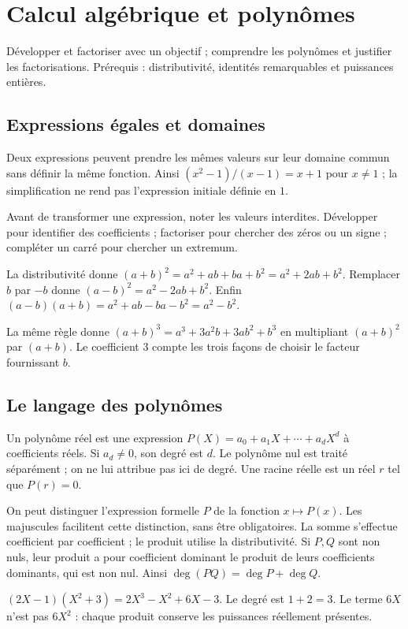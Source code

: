 \documentclass[../cours_1re.tex]{subfiles}
\begin{document}
\setcounter{chapter}{1}
\chapter{Calcul algébrique et polynômes}
\label{ch:02}
\begin{objectif}
Développer et factoriser avec un objectif ; comprendre les polynômes et justifier les factorisations. Prérequis : distributivité, identités remarquables et puissances entières.
\end{objectif}
\section{Expressions égales et domaines}
Deux expressions peuvent prendre les mêmes valeurs sur leur domaine commun sans définir la même fonction.
Ainsi $(x^2-1)/(x-1)=x+1$ pour $x\ne1$ ; la simplification ne rend pas l'expression initiale définie en $1$.
\begin{methode}
Avant de transformer une expression, noter les valeurs interdites. Développer pour identifier des coefficients ; factoriser pour chercher des zéros ou un signe ; compléter un carré pour chercher un extremum.
\end{methode}
\begin{demonstration}
La distributivité donne
$(a+b)^2=a^2+ab+ba+b^2=a^2+2ab+b^2$.
Remplacer $b$ par $-b$ donne $(a-b)^2=a^2-2ab+b^2$.
Enfin $(a-b)(a+b)=a^2+ab-ba-b^2=a^2-b^2$.
\end{demonstration}
La même règle donne $(a+b)^3=a^3+3a^2b+3ab^2+b^3$ en multipliant $(a+b)^2$ par $(a+b)$. Le coefficient $3$ compte les trois façons de choisir le facteur fournissant $b$.
\section{Le langage des polynômes}
\begin{definition}
Un polynôme réel est une expression $P(X)=a_0+a_1X+\cdots+a_dX^d$ à coefficients réels. Si $a_d\ne0$, son degré est $d$. Le polynôme nul est traité séparément ; on ne lui attribue pas ici de degré.
Une racine réelle est un réel $r$ tel que $P(r)=0$.
\end{definition}
On peut distinguer l'expression formelle $P$ de la fonction $x\mapsto P(x)$. Les majuscules facilitent cette distinction, sans être obligatoires.
La somme s'effectue coefficient par coefficient ; le produit utilise la distributivité. Si $P,Q$ sont non nuls, leur produit a pour coefficient dominant le produit de leurs coefficients dominants, qui est non nul. Ainsi
$\deg(PQ)=\deg P+\deg Q$.
\begin{exemple}
$(2X-1)(X^2+3)=2X^3-X^2+6X-3$. Le degré est $1+2=3$. Le terme $6X$ n'est pas $6X^2$ : chaque produit conserve les puissances réellement présentes.
\end{exemple}
\end{document}
